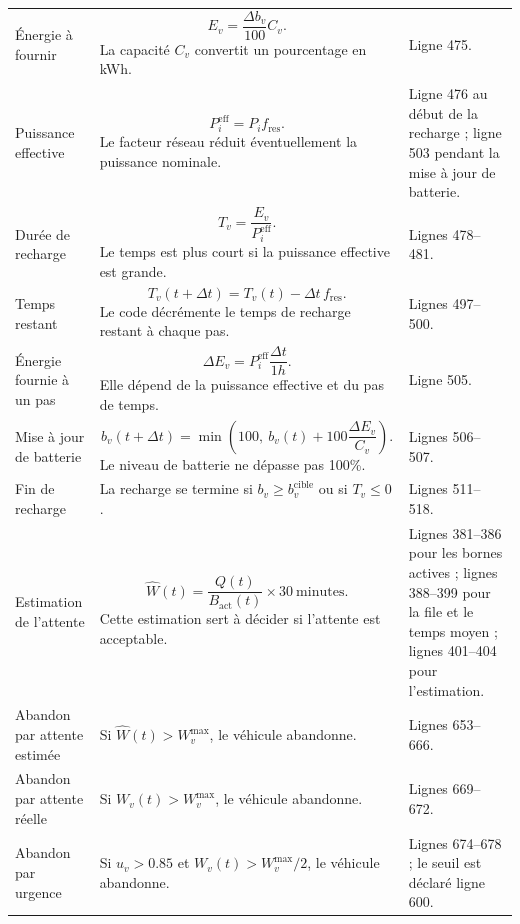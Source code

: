 \documentclass[11pt]{article}
\begin{document}
\begin{longtable}{L{0.25\textwidth} L{0.38\textwidth} L{0.26\textwidth}}
Énergie à fournir &
\[
E_v=\frac{\Delta b_v}{100}C_v.
\]
La capacité $C_v$ convertit un pourcentage en kWh. &
Ligne 475. \\

Puissance effective &
\[
P_i^{\mathrm{eff}}=P_i f_{\mathrm{res}}.
\]
Le facteur réseau réduit éventuellement la puissance nominale. &
Ligne 476 au début de la recharge ; ligne 503 pendant la mise à jour de batterie. \\

Durée de recharge &
\[
T_v=\frac{E_v}{P_i^{\mathrm{eff}}}.
\]
Le temps est plus court si la puissance effective est grande. &
Lignes 478--481. \\

Temps restant &
\[
T_v(t+\Delta t)=T_v(t)-\Delta t\, f_{\mathrm{res}}.
\]
Le code décrémente le temps de recharge restant à chaque pas. &
Lignes 497--500. \\

Énergie fournie à un pas &
\[
\Delta E_v=P_i^{\mathrm{eff}}\frac{\Delta t}{1h}.
\]
Elle dépend de la puissance effective et du pas de temps. &
Ligne 505. \\

Mise à jour de batterie &
\[
b_v(t+\Delta t)=\min\left(100,\ b_v(t)+100\frac{\Delta E_v}{C_v}\right).
\]
Le niveau de batterie ne dépasse pas 100\%. &
Lignes 506--507. \\

Fin de recharge &
La recharge se termine si $b_v\geq b_v^{\mathrm{cible}}$ ou si $T_v\leq 0$. &
Lignes 511--518. \\

Estimation de l'attente &
\[
\widehat{W}(t)=\frac{Q(t)}{B_{\mathrm{act}}(t)}\times 30\ \mathrm{minutes}.
\]
Cette estimation sert à décider si l'attente est acceptable. &
Lignes 381--386 pour les bornes actives ; lignes 388--399 pour la file et le temps moyen ; lignes 401--404 pour l'estimation. \\

Abandon par attente estimée &
Si $\widehat{W}(t)>W_v^{\max}$, le véhicule abandonne. &
Lignes 653--666. \\

Abandon par attente réelle &
Si $W_v(t)>W_v^{\max}$, le véhicule abandonne. &
Lignes 669--672. \\

Abandon par urgence &
Si $u_v>0.85$ et $W_v(t)>W_v^{\max}/2$, le véhicule abandonne. &
Lignes 674--678 ; le seuil est déclaré ligne 600. \\


\end{longtable}
\end{document}
